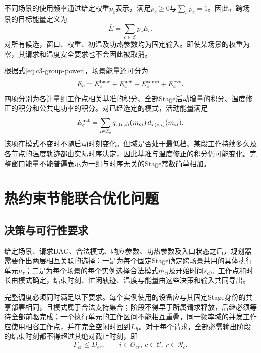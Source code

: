 不同场景的使用频率通过给定权重$p_c$表示，满足$p_c\ge0$与$\sum_cp_c=1$。因此，跨场景的目标能量定义为
\begin{equation}
 \overline E=\sum_{c\in\mathcal C}p_cE_c.
 \label{eq:c3-weighted-energy}
\end{equation}
对所有候选，窗口、权重、初温及功热参数均为固定输入。即使某场景的权重为零，其请求和温度安全要求也不会因此被取消。

根据式\eqref{eq:c3-group-power}，场景能量还可分为
\begin{equation}
 E_c=E_c^{\rm base}+E_c^{\rm act}
     +E_c^{\rm temp}+E_c^{\rm ext}.
 \label{eq:c3-energy-parts}
\end{equation}
四项分别为各计量组工作点相关基准的积分、全部Stage活动增量的积分、温度修正的积分和公共电功率的积分。对已经选定的模式，活动能量满足
\begin{equation}
 E_c^{\rm act}
 =\sum_{i\in\mathcal I_c}
 q_{\tau(c,i)}(m_{ci})\,d_{\tau(c,i)}(m_{ci}).
 \label{eq:c3-act-energy}
\end{equation}
该项在模式不变时不随启动时刻变化。但域是否处于最低档、某段工作持续多久及各节点的温度轨迹都由实际时序决定，因此基准与温度修正的积分仍可能变化。完整窗口能量不能普遍表示为一组与时序无关的Stage常数简单相加。

\section{热约束节能联合优化问题}

\subsection{决策与可行性要求}

给定场景、请求DAG、合法模式、响应参数、功热参数及入口状态之后，规划器需要作出两层相互关联的选择：一是为每个固定Stage确定跨场景共用的具体执行单元$u_\tau$；二是为每个场景的每个实例选择合法模式$m_{ci}$及开始时间$s_{ci}$。工作点和时长由模式确定，结束时刻、忙闲轨迹、温度与能量由这些决策和输入共同导出。

完整调度必须同时满足以下要求。每个实例使用的设备应与其固定Stage身份的共享部署相同，且模式属于合法支持集合；阶段不得早于所属请求释放，后继必须等待全部前驱完成；一个执行单元的工作区间不能相互重叠，同一频率域的并发工作应使用相容工作点，并在完全空闲时回到$L_h$。对于每个请求，全部必需输出阶段的结束时刻都不得超过其绝对截止时刻，即
\begin{equation}
 F_{ci}\le D_{cr},
 \qquad i\in\mathcal O_{cr},\ c\in\mathcal C,\ r\in\mathcal R_c.
 \label{eq:c3-output-deadline}
\end{equation}

